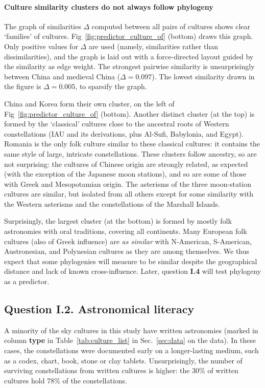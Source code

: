 \documentclass[10pt]{article}
\begin{document}
\paragraph{Culture similarity clusters do not always follow phylogeny} The graph of similarities $\Delta$ computed between all pairs of cultures shows clear `families' of cultures. Fig~\ref{fig:predictor_culture_of} (bottom) draws this graph. Only positive values for $\Delta$ are used (namely, similarities rather than dissimilarities), and the graph is laid out with a force-directed layout guided by the similarity as edge weight. The strongest pairwise similarity is unsurprisingly between China and medieval China ($\Delta=0.097$). The lowest similarity drawn in the figure is $\Delta=0.005$, to sparsify the graph. 

China and Korea form their own cluster, on the left of Fig~\ref{fig:predictor_culture_of} (bottom). Another distinct cluster (at the top) is formed by the `classical' cultures close to the ancestral roots of Western constellations (IAU and its derivations, plus Al-Sufi, Babylonia, and Egypt). Romania is the only folk culture similar to these classical cultures: it contains the same style of large, intricate constellations. These clusters follow ancestry, so are not surprising: the cultures of Chinese origin are strongly related, as expected (with the exception of the Japanese moon stations), and so are some of those with Greek and Mesopotamian origin. The asterisms of the three moon-station cultures are similar, but isolated from all others except for some similarity with the Western asterisms and the constellations of the Marshall Islands.

Surprisingly, the largest cluster (at the bottom) is formed by mostly folk astronomies with oral traditions, covering all continents. Many European folk cultures (also of Greek influence) are \emph{as similar} with N-American, S-American, Austronesian, and Polynesian cultures as they are among themselves. We thus expect that some phylogenies will measure to be similar despite the geographical distance and lack of known cross-influence. Later, question {\bf I.4} will test phylogeny as a predictor.

\subsection*{Question I.2. Astronomical {\bf literacy}} %
%
A minority of the sky cultures in this study have written astronomies (marked in column {\bf type} in Table~\ref{tab:culture_list} in Sec.~\ref{sec:data} on the data). In these cases, the constellations were documented early on a longer-lasting medium, such as a codex, chart, book, stone or clay tablets. Unsurprisingly, the number of surviving constellations from written cultures is higher: the 30\% of written cultures hold 78\% of the constellations.
\end{document}
